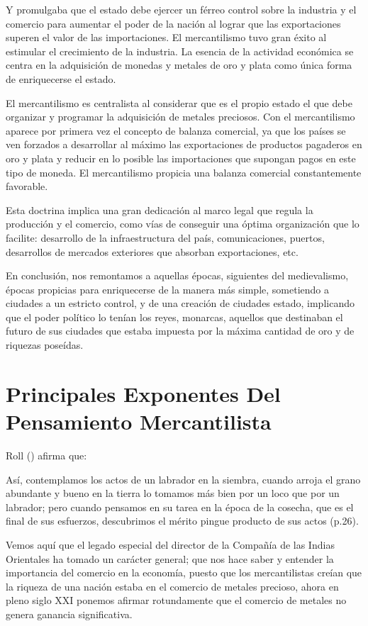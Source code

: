 \documentclass[
  stu,
  floatsintext,
  longtable,
  a4paper,
  nolmodern,
  notxfonts,
  notimes,
  12pt,
  colorlinks=true,linkcolor=blue,citecolor=blue,urlcolor=blue]{apa7}
\begin{document}
Y promulgaba que el estado debe ejercer un férreo control sobre la
industria y el comercio para aumentar el poder de la nación al lograr
que las exportaciones superen el valor de las importaciones. El
mercantilismo tuvo gran éxito al estimular el crecimiento de la
industria. La esencia de la actividad económica se centra en la
adquisición de monedas y metales de oro y plata como única forma de
enriquecerse el estado.

El mercantilismo es centralista al considerar que es el propio estado el
que debe organizar y programar la adquisición de metales preciosos. Con
el mercantilismo aparece por primera vez el concepto de balanza
comercial, ya que los países se ven forzados a desarrollar al máximo las
exportaciones de productos pagaderos en oro y plata y reducir en lo
posible las importaciones que supongan pagos en este tipo de moneda. El
mercantilismo propicia una balanza comercial constantemente favorable.

Esta doctrina implica una gran dedicación al marco legal que regula la
producción y el comercio, como vías de conseguir una óptima organización
que lo facilite: desarrollo de la infraestructura del país,
comunicaciones, puertos, desarrollos de mercados exteriores que absorban
exportaciones, etc.

En conclusión, nos remontamos a aquellas épocas, siguientes del
medievalismo, épocas propicias para enriquecerse de la manera más
simple, sometiendo a ciudades a un estricto control, y de una creación
de ciudades estado, implicando que el poder político lo tenían los
reyes, monarcas, aquellos que destinaban el futuro de sus ciudades que
estaba impuesta por la máxima cantidad de oro y de riquezas poseídas.

\section{Principales Exponentes Del Pensamiento
Mercantilista}\label{principales-exponentes-del-pensamiento-mercantilista}

Roll () afirma
que:

Así, contemplamos los actos de un labrador en la siembra, cuando arroja
el grano abundante y bueno en la tierra lo tomamos más bien por un loco
que por un labrador; pero cuando pensamos en su tarea en la época de la
cosecha, que es el final de sus esfuerzos, descubrimos el mérito pingue
producto de sus actos (p.26).

Vemos aquí que el legado especial del director de la Compañía de las
Indias Orientales ha tomado un carácter general; que nos hace saber y
entender la importancia del comercio en la economía, puesto que los
mercantilistas creían que la riqueza de una nación estaba en el comercio
de metales precioso, ahora en pleno siglo XXI ponemos afirmar
rotundamente que el comercio de metales no genera ganancia
significativa.
\end{document}
